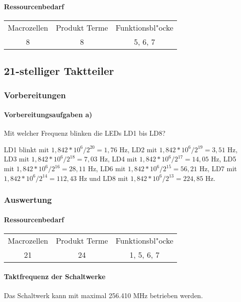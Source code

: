 \documentclass [] {scrartcl}
\begin{document}
  \paragraph{Ressourcenbedarf}
  \begin{table}
    \begin{tabular}{ccc}
      Macrozellen & Produkt Terme & Funktionsbl"ocke\\
      8 & 8 & 5, 6, 7\\
    \end{tabular}
  \end{table}
  \subsection{21-stelliger Taktteiler}
  \subsubsection{Vorbereitungen}
  \paragraph{Vorbereitungsaufgaben a)}
  Mit welcher Frequenz blinken die LEDs LD1 bis LD8?

  LD1 blinkt mit $1,842*10^6/2^{20} = 1,76$ Hz, LD2 mit $1,842*10^6/2^{19} = 3,51$ Hz, LD3 mit $1,842*10^6/2^{18} = 7,03$ Hz,  LD4 mit $1,842*10^6/2^{17} = 14,05$ Hz, LD5 mit $1,842*10^6/2^{16} = 28,11$ Hz, LD6 mit $1,842*10^6/2^{15} = 56,21$ Hz, LD7 mit $1,842*10^6/2^{14} = 112,43$ Hz und LD8 mit $1,842*10^6/2^{13} = 224,85$ Hz.
  
  \subsubsection{Auswertung}
  \paragraph{Ressourcenbedarf}
  \begin{table}
    \begin{tabular}{ccc}
      Macrozellen & Produkt Terme & Funktionsbl"ocke\\
      21 & 24 & 1, 5, 6, 7\\
    \end{tabular}
  \end{table}
  \paragraph{Taktfrequenz der Schaltwerke}
  Das Schaltwerk kann mit maximal 256.410 MHz betrieben werden.
\end{document}
